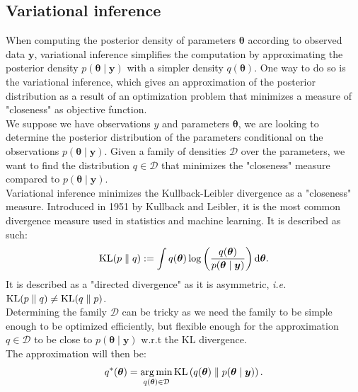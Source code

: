 \documentclass{article}
\DeclareMathOperator*{\argmin}{arg\,min}
\DeclareMathOperator*{\KL}{{\rm KL}}
\begin{document}
\subsection{Variational inference}
When computing the posterior density of parameters $\boldsymbol{\theta}$ according to observed data $\boldsymbol{y}$, variational inference simplifies the computation by approximating the posterior density $p(\boldsymbol{\theta}\mid \boldsymbol{y})$ with a simpler density $q(\boldsymbol{\theta})$. One way to do so is the variational inference, which gives an approximation of the posterior distribution as a result of an optimization problem that minimizes a measure of "closeness" as objective function.\\
\newline
%
We suppose we have observations $y$ and parameters $\boldsymbol{\theta}$, we are looking to determine the posterior distribution of the parameters conditional on the observations $p(\boldsymbol{\theta} \mid \boldsymbol{y})$. Given a family of densities $\mathcal{D}$ over the parameters, we want to find the distribution $q \in \mathcal{D}$ that minimizes the "closeness" measure compared to $p(\boldsymbol{\theta} \mid \boldsymbol{y})$.\\
\newline
%
Variational inference minimizes the Kullback-Leibler divergence as a "closeness" measure. Introduced in 1951 by Kullback and Leibler\cite{kl51}, it is the most common divergence measure used in statistics and machine learning. It is described as such:
\begin{equation*}
\KL(p\parallel q) := \int q(\boldsymbol{\theta})\log \left(\frac{q(\boldsymbol{\theta})}{p(\boldsymbol{\theta} \mid \boldsymbol{y})}\right) \mathrm{d}\boldsymbol{\theta}.
\end{equation*} 
It is described as a "directed divergence" as it is asymmetric, \textit{i.e.} $\KL(p\parallel q) \neq \KL(q \parallel p)$.\\
\newline
%
Determining the family $\mathcal{D}$ can be tricky as we need the family to be simple enough to be optimized efficiently, but flexible enough for the approximation $q \in \mathcal{D}$ to be close to $p(\boldsymbol{\theta} \mid \boldsymbol{y})$ w.r.t the KL divergence.\\
\newline
%
The approximation will then be:
\begin{equation*}
q^*(\boldsymbol{\theta} ) = \argmin_{q(\boldsymbol{\theta}) \in \mathcal{D}} \KL\left( q(\boldsymbol{\theta}) \parallel p(\boldsymbol{\theta} \mid \boldsymbol{y})\right).
\end{equation*}
\end{document}
